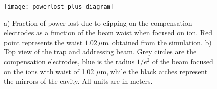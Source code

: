 \begin{figure}
       \centering
         \texttt{[image: powerlost\_plus\_diagram]}
         \caption{a) Fraction of power lost due to clipping on the compensation electrodes as a function of the beam waist when focused on ion. Red point represents the waist $1.02\,\mu$m, obtained from the simulation. b) Top view of the trap and addressing beam. Grey circles are the compensation electrodes, blue is the radius $1/e^2$ of the beam focused on the ions with waist of 1.02 $\mu$m, while the black arches represent the mirrors of the cavity. All units are in meters.}
         \label{lossesplot}
 \end{figure}

%
%



